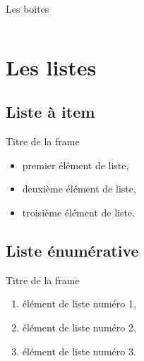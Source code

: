 \documentclass{bredelebeamer}
\begin{document}
\begin{frame}{Les boites}

\begin{columns}

\begin{column}{0.5\textwidth}


\end{column}

\begin{column}{0.5\textwidth}



\end{column}

\end{columns}


\end{frame}



\section{Les listes}
	\subsection{Liste à item}

\begin{frame}{Titre de la frame}

	\begin{itemize}
		\item premier élément de liste,
		\item deuxième élément de liste,
		\item troisième élément de liste.
	\end{itemize}
\end{frame}

		\subsection{Liste énumérative}
\begin{frame}{Titre de la frame}
	\begin{enumerate}
		\item élément de liste numéro 1,
		\item élément de liste numéro 2,
		\item élément de liste numéro 3.
	\end{enumerate}
\end{frame}
\end{document}
